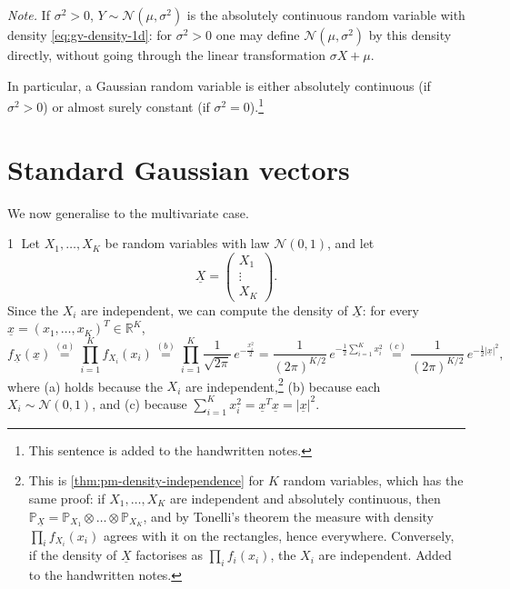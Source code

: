 \emph{Note.} If $\sigma^2>0$, $Y\sim\mathcal N(\mu,\sigma^2)$ is the absolutely continuous random
variable with density \eqref{eq:gv-density-1d}: for $\sigma^2>0$ one may define
$\mathcal N(\mu,\sigma^2)$ by this density directly, without going through the linear
transformation $\sigma X+\mu$.

In particular, a Gaussian random variable is either absolutely continuous (if $\sigma^2>0$) or
almost surely constant (if $\sigma^2=0$).\footnote{This sentence is added to the handwritten notes.}

\section{Standard Gaussian vectors}\label{sec:gv-standard}

We now generalise to the multivariate case.

\textcircled{\scriptsize 1} Let $X_1,\dots,X_K$ be \iid random variables with law
$\mathcal N(0,1)$, and let
\[
  \underline X=\begin{pmatrix}X_1\\\vdots\\X_K\end{pmatrix}.
\]
Since the $X_i$ are independent, we can compute the density of $\underline X$: for every
$\underline x=(x_1,\dots,x_K)^T\in\mathbb R^K$,
\[
  f_{\underline X}(\underline x)\overset{(a)}{=}\prod_{i=1}^Kf_{X_i}(x_i)
  \overset{(b)}{=}\prod_{i=1}^K\frac1{\sqrt{2\pi}}\,e^{-\frac{x_i^2}2}
  =\frac1{(2\pi)^{K/2}}\,e^{-\frac12\sum_{i=1}^Kx_i^2}
  \overset{(c)}{=}\frac1{(2\pi)^{K/2}}\,e^{-\frac12|\underline x|^2},
\]
where (a) holds because the $X_i$ are independent,\footnote{This is
\cref{thm:pm-density-independence} for $K$ random variables, which has the same proof: if
$X_1,\dots,X_K$ are independent and absolutely continuous, then
$\mathbb P_{\underline X}=\mathbb P_{X_1}\otimes\dots\otimes\mathbb P_{X_K}$, and by Tonelli's
theorem the measure with density $\prod_if_{X_i}(x_i)$ agrees with it on the rectangles, hence
everywhere. Conversely, if the density of $\underline X$ factorises as $\prod_if_i(x_i)$, the
$X_i$ are independent. Added to the handwritten notes.} (b) because each $X_i\sim\mathcal N(0,1)$,
and (c) because $\sum_{i=1}^Kx_i^2=\underline x^T\underline x=|\underline x|^2$.

